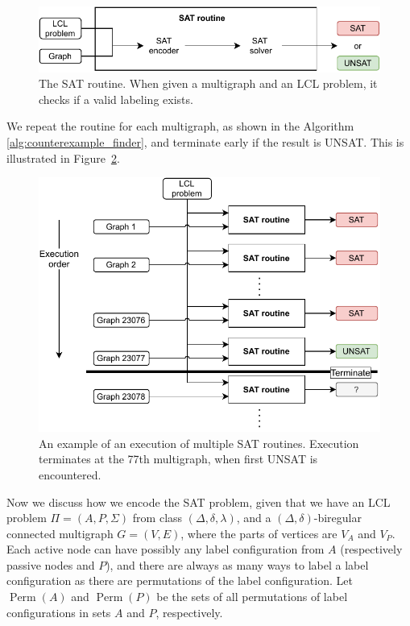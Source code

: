 \begin{figure}[H]
\centering
\includegraphics[]{diagrams/implementation_idea_diagram2.pdf}
\caption{The SAT routine. When given a multigraph and an LCL problem, it checks if a valid labeling exists.}
\label{fig:implementation:1}
\end{figure}

We repeat the routine for each multigraph, as shown in the Algorithm \ref{alg:counterexample_finder}, and terminate early if the result is UNSAT.
This is illustrated in Figure~\ref{fig:implementation:2}.

\begin{figure}[H]
\centering
\includegraphics[]{diagrams/implementation_idea_diagram3.pdf}
\caption{An example of an execution of multiple SAT routines. Execution terminates at the 77th multigraph, when first UNSAT is encountered.}
\label{fig:implementation:2}
\end{figure}

Now we discuss how we encode the SAT problem, given that we have an LCL problem $\Pi=(A, P, \Sigma)$ from class $(\Delta, \delta, \lambda)$, and a $(\Delta, \delta)$-biregular connected multigraph $G=(V,E)$, where the parts of vertices are $V_A$ and $V_P$.
Each active node can have possibly any label configuration from $A$ (respectively passive nodes and $P$), and there are always as many ways to label a label configuration as there are permutations of the label configuration.
Let $\operatorname{Perm}(A)$ and $\operatorname{Perm}(P)$ be the sets of all permutations of label configurations in sets $A$ and $P$, respectively.


